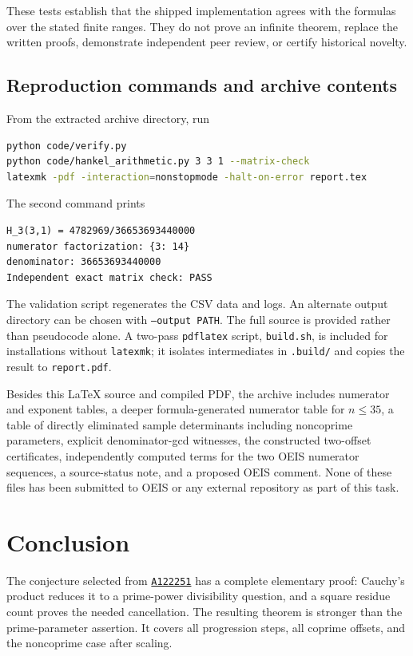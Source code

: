 \documentclass[11pt,a4paper]{article}
\numberwithin{equation}{section}
\theoremstyle{definition}
\theoremstyle{remark}
\newcommand{\OEIS}[1]{\href{https://oeis.org/#1}{\texttt{#1}}}
\begin{document}
These tests establish that the shipped implementation agrees with the formulas over the stated finite ranges. They do not prove an infinite theorem, replace the written proofs, demonstrate independent peer review, or certify historical novelty.

\subsection{Reproduction commands and archive contents}
From the extracted archive directory, run
\begin{lstlisting}[language=bash]
python code/verify.py
python code/hankel_arithmetic.py 3 3 1 --matrix-check
latexmk -pdf -interaction=nonstopmode -halt-on-error report.tex
\end{lstlisting}
The second command prints
\begin{lstlisting}[language={}]
H_3(3,1) = 4782969/36653693440000
numerator factorization: {3: 14}
denominator: 36653693440000
Independent exact matrix check: PASS
\end{lstlisting}
The validation script regenerates the CSV data and logs. An alternate output directory can be chosen with \texttt{--output PATH}. The full source is provided rather than pseudocode alone. A two-pass \texttt{pdflatex} script, \texttt{build.sh}, is included for installations without \texttt{latexmk}; it isolates intermediates in \texttt{.build/} and copies the result to \texttt{report.pdf}.

Besides this \LaTeX{} source and compiled PDF, the archive includes numerator and exponent tables, a deeper formula-generated numerator table for $n\leq35$, a table of directly eliminated sample determinants including noncoprime parameters, explicit denominator-gcd witnesses, the constructed two-offset certificates, independently computed terms for the two OEIS numerator sequences, a source-status note, and a proposed OEIS comment. None of these files has been submitted to OEIS or any external repository as part of this task.

\section{Conclusion}\label{sec:conclusion}
The conjecture selected from \OEIS{A122251} has a complete elementary proof: Cauchy's product reduces it to a prime-power divisibility question, and a square residue count proves the needed cancellation. The resulting theorem is stronger than the prime-parameter assertion. It covers all progression steps, all coprime offsets, and the noncoprime case after scaling.
\end{document}
